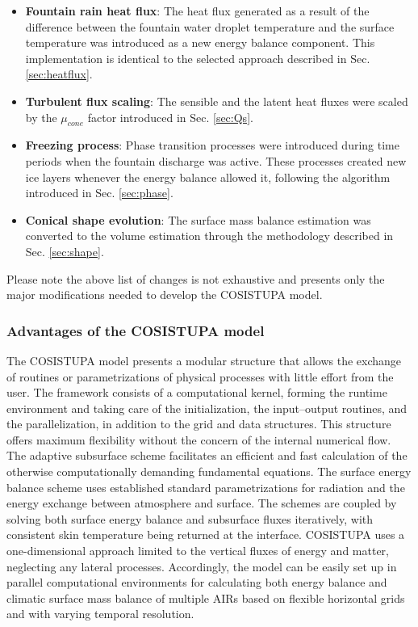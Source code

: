 \begin{itemize}

	\item \textbf{Fountain rain heat flux}: The heat flux generated as a result of the difference between the fountain water droplet
	      temperature and the surface temperature was introduced as a new energy balance component. This implementation is
	      identical to the selected approach described in Sec. \ref{sec:heatflux}.

	\item \textbf{Turbulent flux scaling}: The sensible and the latent heat fluxes were scaled by the $\mu_{cone}$ factor
	      introduced in Sec. \ref{sec:Qs}.

	\item \textbf{Freezing process}: Phase transition processes were introduced during time periods when the fountain
	      discharge was active. These processes created new ice layers whenever the energy balance allowed it,
	      following the algorithm introduced in Sec. \ref{sec:phase}.

	\item \textbf{Conical shape evolution}: The surface mass balance estimation was converted to the volume estimation
	      through the methodology described in Sec. \ref{sec:shape}.

\end{itemize}

Please note the above list of changes is not exhaustive and presents only the major modifications needed to
develop the COSISTUPA model.

\subsubsection{Advantages of the COSISTUPA model}

The COSISTUPA model presents a modular structure that allows the exchange of routines or parametrizations of physical
processes with little effort from the user. The framework consists of a computational kernel, forming
the runtime environment and taking care of the initialization, the input–output routines, and the
parallelization, in addition to the grid and data structures. This structure offers maximum flexibility without
the concern of the internal numerical flow. The adaptive subsurface scheme facilitates an efficient and fast
calculation of the otherwise computationally demanding fundamental equations. The surface energy balance scheme
uses established standard parametrizations for radiation and the energy exchange between atmosphere and surface. The schemes are coupled by solving both surface energy balance and subsurface fluxes
iteratively, with consistent skin temperature being returned at the interface. COSISTUPA uses a one-dimensional
approach limited to the vertical fluxes of energy and matter, neglecting any lateral processes. Accordingly,
the model can be easily set up in parallel computational environments for calculating both energy balance and
climatic surface mass balance of multiple \ac{AIRs} based on flexible horizontal grids and with varying temporal
resolution.

